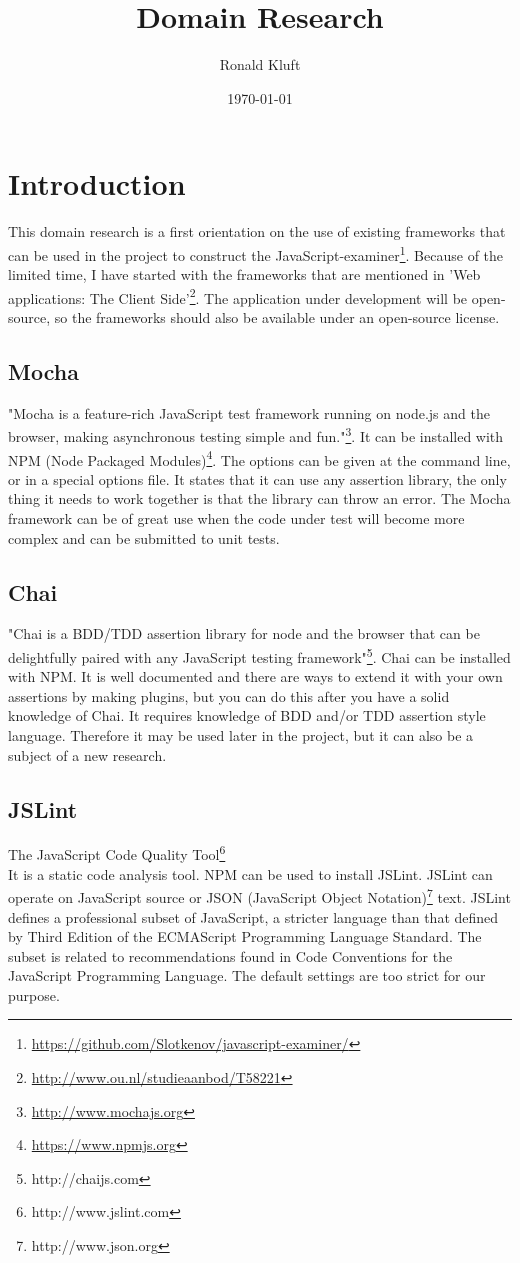 \documentclass{article}
\begin{document}
\title{Domain Research}
\author{Ronald Kluft}
\date{\today}
\maketitle

\section{Introduction}
This domain research is a first orientation on the use of existing frameworks that can be used in the 
project to construct the JavaScript-examiner\footnote{\url{https://github.com/Slotkenov/javascript-examiner/}}.
Because of the limited time, I have started with the frameworks that are mentioned in 
'Web applications: The Client Side'\footnote{\url{http://www.ou.nl/studieaanbod/T58221}}.
The application under development will be open-source, so the frameworks should also be available
under an open-source license.

\subsection{Mocha}
"Mocha is a feature-rich JavaScript test framework running on node.js and the 
browser, making asynchronous testing simple and fun."\footnote{\url{http://www.mochajs.org}}.
It can be installed with NPM (Node Packaged Modules)\footnote{\url{https://www.npmjs.org}}.
The options can be given at the command line, or in a special options file.
It states that it can use any assertion library, the only thing it needs to work together is that the library can throw an error.
The Mocha framework can be of great use when the code under test will become more complex and can be submitted to unit tests.

\subsection{Chai}
"Chai is a BDD/TDD assertion library for node and the browser that can be delightfully paired with any JavaScript testing framework"\footnote{http://chaijs.com}.
Chai can be installed with NPM.
It is well documented and there are ways to extend it with your own assertions by making plugins,
but you can do this after you have a solid knowledge of Chai.
It requires knowledge of BDD and/or TDD assertion style language.
Therefore it may be used later in the project, but it can also be a subject of a new research.

\subsection{JSLint}
The JavaScript Code Quality Tool\footnote{http://www.jslint.com}\\
It is a static code analysis tool.
NPM can be used to install JSLint.
JSLint can operate on JavaScript source or JSON (JavaScript Object Notation)\footnote {http://www.json.org} text.
JSLint defines a professional subset of JavaScript, a stricter language than that 
defined by Third Edition of the ECMAScript Programming Language Standard.
The subset is related to recommendations found in Code Conventions for the JavaScript Programming Language.
The default settings are too strict for our purpose.
\end{document}
